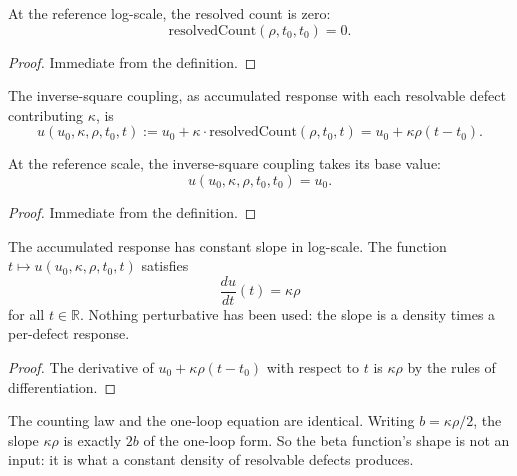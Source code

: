 \begin{theorem}
At the reference log-scale, the resolved count is zero:
\begin{equation}
\text{resolvedCount}(\rho, t_0, t_0) = 0 .
\end{equation}
\end{theorem}

\begin{proof}
Immediate from the definition.
\end{proof}

\begin{definition}
The inverse-square coupling, as accumulated response with each resolvable defect contributing $\kappa$, is
\begin{equation}
u(u_0, \kappa, \rho, t_0, t) := u_0 + \kappa \cdot \text{resolvedCount}(\rho, t_0, t) = u_0 + \kappa \rho (t - t_0) .
\end{equation}
\end{definition}

\begin{theorem}
At the reference scale, the inverse-square coupling takes its base value:
\begin{equation}
u(u_0, \kappa, \rho, t_0, t_0) = u_0 .
\end{equation}
\end{theorem}

\begin{proof}
Immediate from the definition.
\end{proof}

\begin{theorem}
The accumulated response has constant slope in log-scale. The function $t \mapsto u(u_0, \kappa, \rho, t_0, t)$ satisfies
\begin{equation}
\frac{du}{dt}(t) = \kappa \rho
\end{equation}
for all $t \in \mathbb{R}$. Nothing perturbative has been used: the slope is a density times a per-defect response.
\end{theorem}

\begin{proof}
The derivative of $u_0 + \kappa \rho(t - t_0)$ with respect to $t$ is $\kappa \rho$ by the rules of differentiation.
\end{proof}

\begin{theorem}
The counting law and the one-loop equation are identical. Writing $b = \kappa\rho/2$, the slope $\kappa\rho$ is exactly $2b$ of the one-loop form. So the beta function's shape is not an input: it is what a constant density of resolvable defects produces.
\end{theorem}

